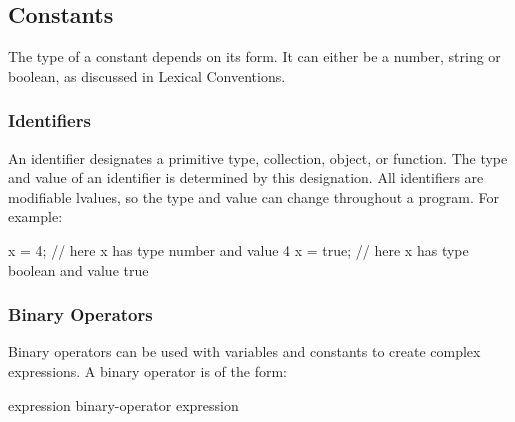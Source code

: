 \documentclass[oneside]{book}
\begin{document}
\subsection{Constants}

The type of a constant depends on its form. It can either be a number, string or boolean, as discussed in Lexical Conventions.

\subsubsection{Identifiers}

An identifier designates a primitive type, collection, object, or function. The type and value of an identifier is determined by this designation. All identifiers are modifiable lvalues, so the type and value can change throughout a program. For example:
\begin{mdframed}
[hidealllines=true,backgroundcolor=gray!10,skipbelow=.5em,skipabove=.5em]
\begin{code}
x = 4;
// here x has type number and value 4
x = true;
// here x has type boolean and value true
\end{code}
\end{mdframed}

\subsubsection{Binary Operators}

Binary operators can be used with variables and constants to create complex expressions. A binary operator is of the form:
\begin{code}
expression binary-operator expression
\end{code}
\end{document}
